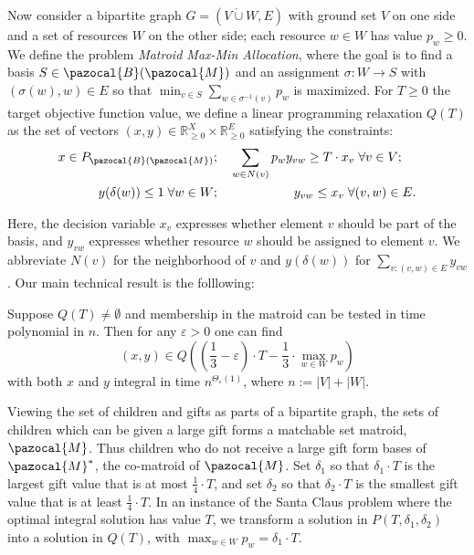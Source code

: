 Now consider a bipartite graph $G = (V \dot{\cup} W,E)$ with ground set $V$ on one side and
a set of resources $W$ on the other side; each resource $w \in W$ has
value $p_w \geq 0$. 
We define the problem \emph{Matroid Max-Min Allocation}, 
where the goal is to find a basis $S \in \pazocal{B}(\pazocal{M})$ and an 
assignment $\sigma : W \to S$ with $(\sigma(w),w) \in E$ so that $\min_{v \in S} \sum_{w \in \sigma^{-1}(v)} p_w$ 
is maximized. 
For $T \geq 0$ the target objective function value, 
we define a linear programming relaxation $Q(T)$ as the set of vectors 
$(x,y) \in \mathbb{R}_{\geq 0}^X \times \mathbb{R}_{\geq 0}^E$
satisfying the constraints:
\begin{eqnarray*}
 x \in P_{\pazocal{B}(\pazocal{M})};& \quad 
 \sum_{w \in N(v)} p_wy_{vw} \geq T \cdot x_v \;  \forall v \in V;\\
  \quad  y(\delta(w)) \leq 1 \;
  \forall w \in W;& \qquad \qquad \qquad y_{vw} \leq x_v \; \forall (v,w) \in E.
\end{eqnarray*} 

Here, the decision variable $x_v$ expresses whether element $v$ should be part of the basis, and
$y_{vw}$ expresses whether resource $w$ should be assigned to element $v$. We abbreviate 
$N(v)$ for the neighborhood of $v$ and $y(\delta(w))$ for $\sum_{v : (v,w) \in E} y_{vw}$.
Our main technical result is the folllowing: 
\begin{theorem}\label{thm:MainMatroidAlgorithm} \cite{DaviesRZ20}
Suppose $Q(T) \neq \emptyset$ and membership in the matroid can be tested in time polynomial in $n$.
Then for any $\varepsilon>0$ one can find
 \[
   (x,y) \in Q \left (
    \left (\frac13 - \varepsilon \right ) \cdot T - \frac13 \cdot \max_{w \in W} p_w \right )
 \] 
with both $x$ and $y$ integral in time $n^{\Theta_{\varepsilon}(1)}$, where $n := |V| + |W|$. 
\end{theorem}


Viewing the set of children and gifts as parts of a bipartite graph, 
the sets of children which can be given a large gift forms a matchable set matroid, $\pazocal{M}$.
Thus children who do not receive a large gift form bases of $\pazocal{M}^*$, the co-matroid of $\pazocal{M}$.
Set $\delta_1$ so that $\delta_1 \cdot T$ is the largest gift value that is at most
$\frac14 \cdot T$, and set $\delta_2$ so that $\delta_2 \cdot T$ is the smallest gift value that is at least $\frac14 \cdot T$. 
In an instance of the Santa Claus problem where the optimal integral solution has value $T$, 
we transform a solution in $P(T,\delta_1,\delta_2)$ into a solution in $Q(T)$, with $\max_{w \in W} p_w = \delta_1 \cdot T$.

